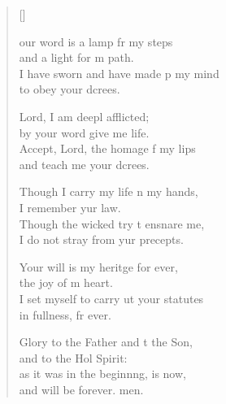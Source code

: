 \settowidth{\versewidth}{I set myself to carry out your statutes *}
\begin{verse}[\versewidth]
  \begin{patverse}
our word is a lamp fr my steps\Med\\
and a light for m path.\\
I have sworn and have made p my mind\Med\\
to obey your dcrees.

Lord, I am deepl afflicted;\Med\\
by your word give me life.\\
Accept, Lord, the homage f my lips\Med\\
and teach me your dcrees.

Though I carry my life n my hands,\Med\\
I remember yur law.\\
Though the wicked try t ensnare me,\Med\\
I do not stray from yur precepts.

Your will is my heritge for ever,\Med\\
the joy of m heart.\\
I set myself to carry ut your statutes\Med\\
in fullness, fr ever.

Glory to the Father and t the Son,\Med\\
and to the Hol Spirit:\\
as it was in the beginnng, is now,\Med\\
and will be forever. men. 
  \end{patverse}
\end{verse}
